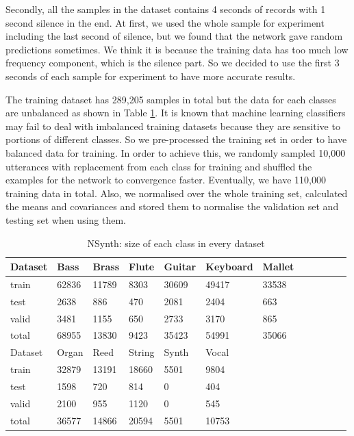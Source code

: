 \documentclass{article}
\begin{document}
Secondly, all the samples in the dataset contains 4 seconds of records with 1 second silence in the end. At first, we used the whole sample for experiment including the last second of silence, but we found that the network gave random predictions sometimes. We think it is because the training data has too much low frequency component, which is the silence part. So we decided to use the first 3 seconds of each sample for experiment to have more accurate results.

The training dataset has 289,205 samples in total but the data for each classes are unbalanced as shown in Table \ref{tab:dataset}. It is known that machine learning classifiers may fail to deal with imbalanced training datasets because they are sensitive to portions of different classes. So we pre-processed the training set in order to have balanced data for training. In order to achieve this, we randomly sampled 10,000 utterances with replacement from each class for training and shuffled the examples for the network to convergence faster. Eventually, we have 110,000 training data in total. Also, we normalised over the whole training set, calculated the means and covariances and stored them to normalise the validation set and testing set when using them.

\begin{table}[h]
  \caption{NSynth: size of each class in every dataset}
  \label{tab:dataset}
  \centering
  \begin{tabular}{llllllllllll}
    \toprule
    Dataset  &Bass	& Brass	& Flute	& Guitar	& Keyboard	& Mallet\\
    \midrule
    train & 62836	& 11789	& 8303	& 30609	& 49417	& 33538\\
    test & 2638	& 886	& 470	& 2081	& 2404	& 663\\
    valid & 3481	& 1155	& 650	& 2733	& 3170	& 865\\
    total & 68955	& 13830	& 9423	& 35423	& 54991	& 35066\\
    \toprule
    Dataset  & Organ & Reed	& String    & Synth	& Vocal\\
    \midrule
    train	& 32879	& 13191	& 18660	& 5501	& 9804\\
    test   & 1598	& 720	& 814	& 0	    & 404\\
    valid    & 2100	& 955	& 1120	& 0	    & 545\\
    total   & 36577	& 14866	& 20594	& 5501	& 10753\\
    \bottomrule
  \end{tabular}
\end{table}
\end{document}
